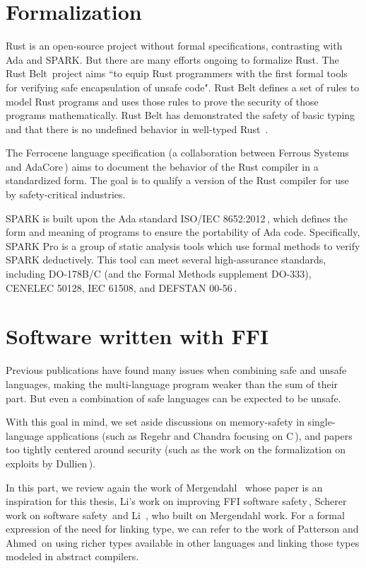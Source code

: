 \documentclass[nomenclature, english, bibtex]{kththesis}
\begin{document}
\section{Formalization}

Rust is an open-source project without formal specifications, contrasting with Ada and SPARK. But there are many efforts ongoing to formalize Rust. The Rust Belt\,\cite{jung_rustbelt_2018} project aims ``to equip Rust programmers with the first formal tools for verifying safe encapsulation of unsafe code". Rust Belt defines a set of rules to model Rust programs and uses those rules to prove the security of those programs mathematically. Rust Belt has demonstrated the safety of basic typing and that there is no undefined behavior in well-typed Rust \,\cite{xu_memory-safety_2021}. 

The Ferrocene language specification (a collaboration between Ferrous Systems and AdaCore\,\cite{noauthor_ferrocene_2023}) aims to document the behavior of the Rust compiler in a standardized form. The goal is to qualify a version of the Rust compiler for use by safety-critical industries.

SPARK is built upon the Ada standard ISO/IEC 8652:2012\,\cite{1400-1700_isoiec_2013}, which defines the form and meaning of programs to ensure the portability of Ada code. Specifically, SPARK Pro is a group of static analysis tools which use formal methods to verify SPARK deductively. This tool can meet several high-assurance standards, including DO-178B/C (and the Formal Methods supplement DO-333), CENELEC 50128, IEC 61508, and DEFSTAN 00-56\,\cite{jaloyan_safe_2017}.

\section{Software written with FFI}

Previous publications have found many issues when combining safe and unsafe languages, making the multi-language program weaker than the sum of their part. But even a combination of safe languages can be expected to be unsafe.

With this goal in mind, we set aside discussions on \gls{memory-safety} in single-language applications (such as Regehr \etal and Chandra \etal focusing on C\,\cite{regehr_efficient_2006,chandra_physical_1999}), and papers too tightly centered around security (such as the work on the formalization on exploits by Dullien\,\cite{dullien_weird_2020}). 

In this part, we review again the work of Mergendahl \etal\,\cite{mergendahl_cross-language_2022} whose paper is an inspiration for this thesis, Li's work on improving FFI software safety\,\cite{li_improving_2014}, Scherer work on software safety\,\cite{scherer_engineering_2021} and Li \etal\,\cite{li_detecting_2022}, who built on Mergendahl \etal work. For a formal expression of the need for linking type, we can refer to the work of Patterson and Ahmed\,\cite{patterson_linking_2017} on using richer types available in other languages and linking those types modeled in abstract compilers.
\end{document}
